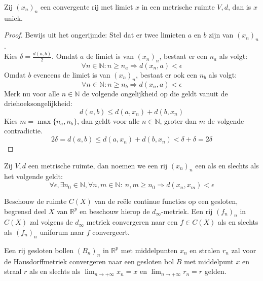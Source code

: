 \documentclass[main.tex]{subfiles}
\begin{document}
\begin{bst}
  Zij $(x_{n})_{n}$ een convergente rij met limiet $x$ in een metrische ruimte $V,d$, dan is $x$ uniek.

  \begin{proof}
    Bewijs uit het ongerijmde: Stel dat er twee limieten $a$ en $b$ zijn van $(x_{n})_{n}$.\\
    Kies $\delta = \frac{d(a,b)}{2}$.
    Omdat $a$ de limiet is van $(x_{n})_{n}$, bestaat er een $n_{a}$ als volgt:
    \[ \forall n\in \mathbb{N}: n \ge n_{a} \Rightarrow d(x_{n},a) < \epsilon \]
    Omdat $b$ eveneens de limiet is van  $(x_{n})_{n}$, bestaat er ook een $n_{b}$ als volgt:
    \[ \forall n\in \mathbb{N}: n \ge n_{b} \Rightarrow d(x_{n},a) < \epsilon \]
    Merk nu voor alle $n\in \mathbb{N}$ de volgende ongelijkheid op die geldt vanuit de driehoeksongelijkheid:
    \[ d(a,b) \le d(a,x_{n}) + d(b,x_{n}) \]
    Kies $m = \max\{n_{a},n_{b}\}$, dan geldt voor alle $n\in \mathbb{N}$, groter dan $m$ de volgende contradictie.
    \[ 2\delta = d(a,b) \le d(a,x_{n}) + d(b,x_{n}) < \delta + \delta = 2\delta \]
  \end{proof}
\end{bst}
        
\begin{de}
  Zij $V,d$ een metrische ruimte, dan noemen we een rij $(x_{n})_{n}$ een  als en slechts als het volgende geldt:
  \[ \forall \epsilon, \exists n_{0} \in \mathbb{N}, \forall n,m\in \mathbb{N}:\ n,m\ge n_{0} \Rightarrow d(x_{n},x_{m}) < \epsilon \]
\end{de}

\begin{st}
  Beschouw de ruimte $C(X)$ van de re\"ele continue functies op een gesloten, begrensd deel $X$ van $\mathbb{R}^{p}$ en beschouw hierop de $d_{\infty}$-metriek.
  Een rij $(f_{n})_{n}$ in $C(X)$ zal volgens de $d_{\infty}$ metriek convergeren naar een $f\in C(X)$ als en slechts als $(f_{n})_{n}$ uniforum naar $f$ convergeert.
\end{st}

\begin{st}
  Een rij gesloten bollen $(B_{n})_{n}$ in $\mathbb{R}^{p}$ met middelpunten $x_{n}$ en stralen $r_{n}$ zal voor de Hausdorffmetriek convergeren naar een gesloten bol $B$ met middelpunt $x$ en straal $r$ als en slechts als $\lim_{n\rightarrow +\infty}x_{n}=x$ en $\lim_{n\rightarrow +\infty}r_{n} = r$ gelden.
\end{st}
\end{document}
